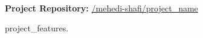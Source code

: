 \\

\vspace{\topsep}
{\bf Project Repository: }\href{project\_url}{\github/mehedi-shafi/project\_name}
\vspace{\topsep}

\begin{tightitemize}

\item project_features.

\end{tightitemize}

\sectionspace